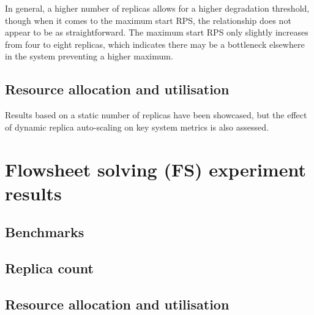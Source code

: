 In general, a higher number of replicas allows for a higher degradation threshold, though when it comes to the maximum start RPS, the relationship does not appear to be as straightforward. The maximum start RPS only slightly increases from four to eight replicas, which indicates there may be a bottleneck elsewhere in the system preventing a higher maximum.

\subsection{Resource allocation and utilisation}

Results based on a static number of replicas have been showcased, but the effect of dynamic replica auto-scaling on key system metrics is also assessed.


\section{Flowsheet solving (FS) experiment results}

\subsection{Benchmarks}


\subsection{Replica count}


\subsection{Resource allocation and utilisation}


